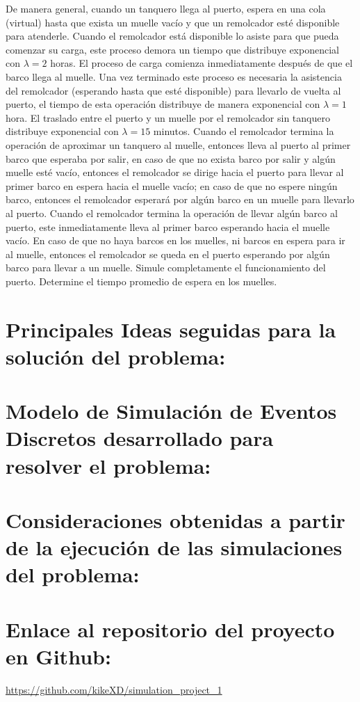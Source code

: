 \documentclass[titlepage,11pt]{scrartcl}
\begin{document}
	De manera general, cuando un tanquero llega al puerto, espera en una cola (virtual) hasta que exista un muelle vacío y que un remolcador esté disponible para atenderle. Cuando el remolcador está disponible lo asiste para que pueda comenzar su carga, este proceso demora un tiempo que distribuye exponencial con $\lambda = 2$ horas. El proceso de carga comienza inmediatamente después de que el barco llega al muelle. Una vez terminado este proceso es necesaria la asistencia del remolcador (esperando hasta que esté disponible) para llevarlo de vuelta al puerto, el tiempo de esta operación distribuye de manera exponencial con $\lambda = 1$ hora. El traslado entre el puerto y un muelle por el remolcador sin tanquero distribuye exponencial con $\lambda = 15$ minutos. Cuando el remolcador termina la operación de aproximar un tanquero al muelle, entonces lleva al puerto al primer barco que esperaba por salir, en caso de que no exista barco por salir y algún muelle esté vacío, entonces el remolcador se dirige hacia el puerto para llevar al primer barco en espera hacia el muelle vacío; en caso de que no espere ningún barco, entonces el remolcador esperará por algún barco en un muelle para llevarlo al puerto. Cuando el remolcador termina la operación de llevar algún barco al puerto, este inmediatamente lleva al primer barco esperando hacia el muelle vacío. En caso de que no haya barcos en los muelles, ni barcos en espera para ir al muelle, entonces el remolcador se queda en el puerto esperando por algún barco para llevar a un muelle. Simule completamente el funcionamiento del puerto. Determine el tiempo promedio de espera en los muelles.

\section{Principales Ideas seguidas para la solución del problema:}

\section{Modelo de Simulación de Eventos Discretos desarrollado para resolver el
problema:}

\section{Consideraciones obtenidas a partir de la ejecución de las simulaciones del
problema:}

\section{Enlace al repositorio del proyecto en Github:}
	\url{https://github.com/kikeXD/simulation_project_1}
\end{document}
